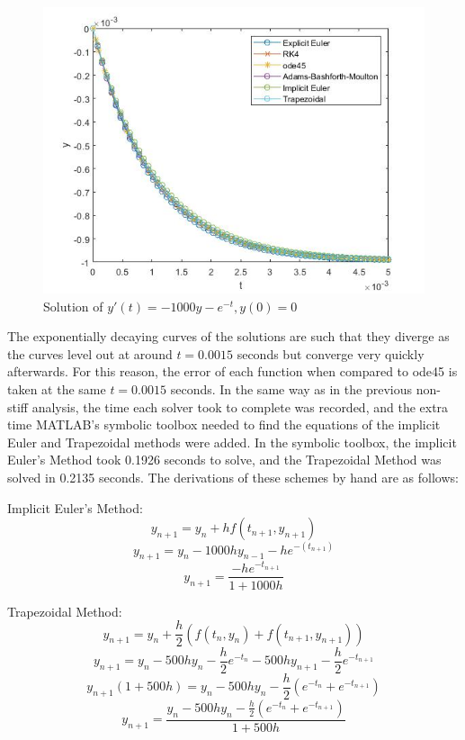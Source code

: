 \documentclass[11pt]{article}
\begin{document}
\begin{figure} [!h]
\centering
        \includegraphics[totalheight=7cm]{figure4.jpg}
    \caption{Solution of $y'(t)=-1000y-e^{-t}, y(0)=0$}
    \label{figure7}
\end{figure}

The exponentially decaying curves of the solutions are such that they diverge
as the curves level out at around $t=0.0015$ seconds but converge very quickly afterwards.
For this reason, the error of each function when compared to ode45 is taken at the same
$t=0.0015$ seconds. In the same way as in the previous non-stiff analysis, the time each
solver took to complete was recorded, and the extra time MATLAB's symbolic
toolbox needed to find the equations of the implicit Euler and Trapezoidal methods
were added. In the symbolic toolbox, the implicit Euler's Method took 0.1926 seconds to solve,
and the Trapezoidal Method was solved in 0.2135 seconds. The derivations of these 
schemes by hand are as follows:
 
Implicit Euler's Method:
$$y_{n+1}=y_{n}+hf(t_{n+1}, y_{n+1})$$
$$y_{n+1}=y_{n}-1000hy_{n-1}-he^{-(t_{n+1})}$$
$$y_{n+1}=\frac{-he^{-t_{n+1}}}{1+1000h}$$

Trapezoidal Method:
$$y_{n+1}=y_{n}+\frac{h}{2}(f(t_{n},y_{n})+f(t_{n+1},y_{n+1}))$$
$$y_{n+1}=y_{n}-500hy_{n}-\frac{h}{2}e^{-t_{n}}-500hy_{n+1}-\frac{h}{2}e^{-t_{n+1}}$$
$$y_{n+1}(1+500h)=y_{n}-500hy_{n}-\frac{h}{2}(e^{-t_{n}}+e^{-t_{n+1}})$$
$$y_{n+1}=\frac{y_{n}-500hy_{n}-\frac{h}{2}(e^{-t_{n}}+e^{-t_{n+1}})}{1+500h}$$
\end{document}
